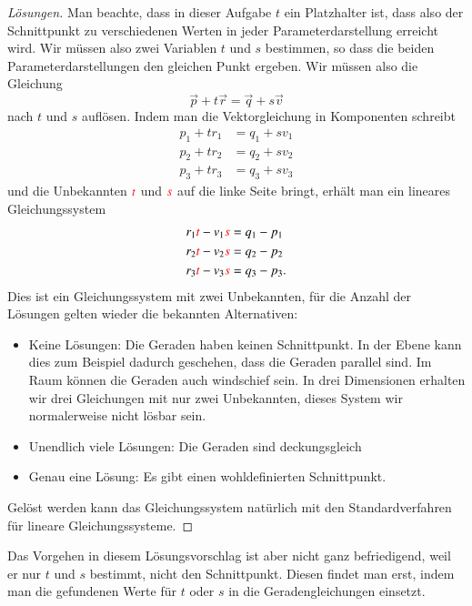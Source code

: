 \begin{proof}[Lösungen]
Man beachte, dass in dieser Aufgabe $t$ ein Platzhalter ist, dass also
der Schnittpunkt zu verschiedenen Werten in jeder Parameterdarstellung
erreicht wird.
Wir müssen also zwei Variablen $t$ und $s$ bestimmen, so dass die beiden
Parameterdarstellungen den gleichen Punkt ergeben.
Wir müssen also die Gleichung
\[
\vec{p} + t\vec{r}
=
\vec{q} + s\vec{v}
\]
nach $t$ und $s$ auflösen.
Indem man die Vektorgleichung in Komponenten schreibt
\begin{align*}
p_1+tr_1 &= q_1+sv_1\\
p_2+tr_2 &= q_2+sv_2\\
p_3+tr_3 &= q_3+sv_3
\end{align*}
und die Unbekannten $\color{red}t$ und $\color{red}s$ auf die linke Seite bringt, erhält
man ein lineares Gleichungssystem 
\begin{align*}
r_1{\color{red}t}-v_1{\color{red}s}&= q_1-p_1\\
r_2{\color{red}t}-v_2{\color{red}s}&= q_2-p_2\\
r_3{\color{red}t}-v_3{\color{red}s}&= q_3-p_3.
\end{align*}
Dies ist ein Gleichungssystem mit zwei Unbekannten, für die Anzahl der Lösungen
gelten wieder die bekannten Alternativen:
\begin{itemize}
\item Keine Lösungen: Die Geraden haben keinen Schnittpunkt.
In der Ebene
kann dies zum Beispiel dadurch geschehen, dass die Geraden parallel sind.
Im Raum können die Geraden auch windschief sein.
In drei Dimensionen erhalten wir drei Gleichungen mit nur zwei Unbekannten,
dieses System wir normalerweise nicht lösbar sein.
\item Unendlich viele Lösungen: Die Geraden sind deckungsgleich
\item Genau eine Lösung: Es gibt einen wohldefinierten Schnittpunkt.
\end{itemize}
Gelöst werden kann das Gleichungssystem natürlich mit den Standardverfahren
für lineare Gleichungssysteme.
\end{proof}

Das Vorgehen in diesem Lösungsvorschlag ist aber nicht ganz befriedigend,
weil er nur $t$ und $s$ bestimmt, nicht den Schnittpunkt.
Diesen findet man erst, indem man die gefundenen Werte für $t$ oder $s$
in die Geradengleichungen einsetzt.


